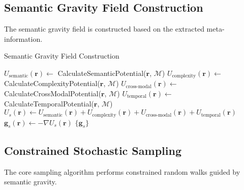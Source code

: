 \documentclass[12pt,a4paper]{article}
\begin{document}
\subsection{Semantic Gravity Field Construction}

The semantic gravity field is constructed based on the extracted meta-information.

\begin{algorithm}[H]
\caption{Semantic Gravity Field Construction}
\begin{algorithmic}[1]
        \State $U_{\text{semantic}}(\mathbf{r}) \leftarrow$ CalculateSemanticPotential($\mathbf{r}$, $\mathcal{M}$)
        \State $U_{\text{complexity}}(\mathbf{r}) \leftarrow$ CalculateComplexityPotential($\mathbf{r}$, $\mathcal{M}$)
        \State $U_{\text{cross-modal}}(\mathbf{r}) \leftarrow$ CalculateCrossModalPotential($\mathbf{r}$, $\mathcal{M}$)
        \State $U_{\text{temporal}}(\mathbf{r}) \leftarrow$ CalculateTemporalPotential($\mathbf{r}$, $\mathcal{M}$)
        \State $U_s(\mathbf{r}) \leftarrow U_{\text{semantic}}(\mathbf{r}) + U_{\text{complexity}}(\mathbf{r}) + U_{\text{cross-modal}}(\mathbf{r}) + U_{\text{temporal}}(\mathbf{r})$
        \State $\mathbf{g}_s(\mathbf{r}) \leftarrow -\nabla U_s(\mathbf{r})$
    \EndFor
    \State \Return $\{\mathbf{g}_s\}$
\EndProcedure
\end{algorithmic}
\end{algorithm}

\subsection{Constrained Stochastic Sampling}

The core sampling algorithm performs constrained random walks guided by semantic gravity.
\end{document}
